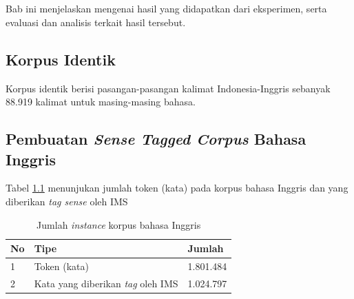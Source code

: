 \chapter{\babLima}
Bab ini menjelaskan mengenai hasil yang didapatkan dari eksperimen, serta evaluasi dan analisis terkait hasil tersebut.

\section{Korpus Identik}
Korpus identik berisi pasangan-pasangan kalimat Indonesia-Inggris sebanyak 88.919 kalimat untuk masing-masing bahasa.

\section{Pembuatan \textit{Sense Tagged Corpus} Bahasa Inggris}
Tabel \ref{table:sense-tagged-corpus} menunjukan jumlah token (kata) pada korpus bahasa Inggris dan yang diberikan \textit{tag sense} oleh IMS

\begin{table}
	\centering
	\caption{Jumlah \textit{instance} korpus bahasa Inggris}
	\label{table:sense-tagged-corpus}
	\begin{tabular}{|p{0.7cm}|p{4cm}|p{4cm}|}
		\hline
		No & Tipe & Jumlah
		\\ \hline
		1    & 
		Token (kata)   & 
		1.801.484
		\\ \hline
		2    & 
		Kata yang diberikan \textit{tag} oleh IMS     & 
		1.024.797 
		\\ \hline
	\end{tabular}
\end{table}

